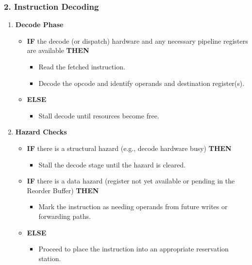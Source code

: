 {  \subsubsection*{2. Instruction Decoding}
  \vspace{-5px}
  \begin{enumerate}
      \item \textbf{Decode Phase}
      \begin{itemize}
          \item \textbf{IF} the decode (or dispatch) hardware and any necessary pipeline registers are available \textbf{THEN}
          \begin{itemize}
              \item Read the fetched instruction.
              \item Decode the opcode and identify operands and destination register(s).
          \end{itemize}
          \item \textbf{ELSE}
          \begin{itemize}
              \item Stall decode until resources become free.
          \end{itemize}
      \end{itemize}
      \item \textbf{Hazard Checks}
      \begin{itemize}
          \item \textbf{IF} there is a structural hazard (e.g., decode hardware busy) \textbf{THEN}
          \begin{itemize}
              \item Stall the decode stage until the hazard is cleared.
          \end{itemize}
          \item \textbf{IF} there is a data hazard (register not yet available or pending in the Reorder Buffer) \textbf{THEN}
          \begin{itemize}
              \item Mark the instruction as needing operands from future writes or forwarding paths.
          \end{itemize}
          \item \textbf{ELSE}
          \begin{itemize}
              \item Proceed to place the instruction into an appropriate reservation station.
          \end{itemize}
      \end{itemize}
  \end{enumerate}
  \vspace{-15px}
}
